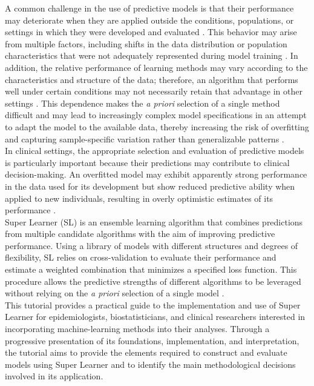 \documentclass[12pt]{article}
\begin{document}
A common challenge in the use of predictive models is that their performance may deteriorate when they are applied outside the conditions, populations, or settings in which they were developed and evaluated \cite{Collinse074819}. This behavior may arise from multiple factors, including shifts in the data distribution or population characteristics that were not adequately represented during model training \cite{Zhang2022Shifting}. In addition, the relative performance of learning methods may vary according to the characteristics and structure of the data; therefore, an algorithm that performs well under certain conditions may not necessarily retain that advantage in other settings \cite{ALI2006119,Uddin2024}. This dependence makes the \textit{a priori} selection of a single method difficult and may lead to increasingly complex model specifications in an attempt to adapt the model to the available data, thereby increasing the risk of overfitting and capturing sample-specific variation rather than generalizable patterns \cite{Pavlou2016}. \\
In clinical settings, the appropriate selection and evaluation of predictive models is particularly important because their predictions may contribute to clinical decision-making. An overfitted model may exhibit apparently strong performance in the data used for its development but show reduced predictive ability when applied to new individuals, resulting in overly optimistic estimates of its performance \cite{Riley2020,Collins2024}. \\
Super Learner (SL) is an ensemble learning algorithm that combines predictions from multiple candidate algorithms with the aim of improving predictive performance. Using a library of models with different structures and degrees of flexibility, SL relies on cross-validation to evaluate their performance and estimate a weighted combination that minimizes a specified loss function. This procedure allows the predictive strengths of different algorithms to be leveraged without relying on the \textit{a priori} selection of a single model \cite{vanDerLaan2007}. \\
This tutorial provides a practical guide to the implementation and use of Super Learner for epidemiologists, biostatisticians, and clinical researchers interested in incorporating machine-learning methods into their analyses. Through a progressive presentation of its foundations, implementation, and interpretation, the tutorial aims to provide the elements required to construct and evaluate models using Super Learner and to identify the main methodological decisions involved in its application.
\end{document}
